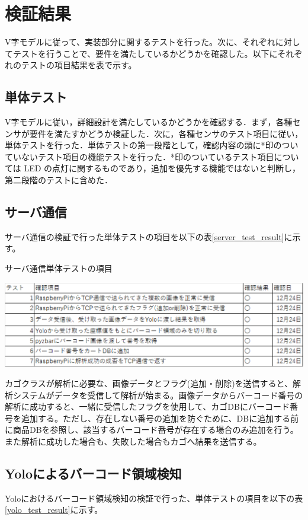 \section{検証結果}
V字モデルに従って、実装部分に関するテストを行った。次に、それぞれに対してテストを行うことで、要件を満たしているかどうかを確認した。以下にそれぞれのテストの項目結果を表で示す。

\subsection{単体テスト}
V字モデルに従い，詳細設計を満たしているかどうかを確認する．まず，各種センサが要件を満たすかどうか検証した．次に，各種センサのテスト項目に従い，単体テストを行った．単体テストの第一段階として，確認内容の頭に*印のついていないテスト項目の機能テストを行った．*印のついているテスト項目については LED の点灯に関するものであり，追加を優先する機能ではないと判断し，第二段階のテストに含めた．

\subsection*{サーバ通信}
サーバ通信の検証で行った単体テストの項目を以下の表\ref{server_test_result}に示す。
\begin{table}[htbp]
\centering
\caption{サーバ通信単体テストの項目}
\includegraphics[width=14cm]{./pic/result/server_test_result.eps}
\label{server_test_result}
\end{table}

カゴクラスが解析に必要な、画像データとフラグ(追加・削除)を送信すると、解析システムがデータを受信して解析が始まる。画像データからバーコード番号の解析に成功すると、一緒に受信したフラグを使用して、カゴDBにバーコード番号を追加する。ただし、存在しない番号の追加を防ぐために、DBに追加する前に商品DBを参照し、該当するバーコード番号が存在する場合のみ追加を行う。また解析に成功した場合も、失敗した場合もカゴへ結果を送信する。

\subsection*{Yoloによるバーコード領域検知}
Yoloにおけるバーコード領域検知の検証で行った、単体テストの項目を以下の表\ref{yolo_test_result}に示す。

